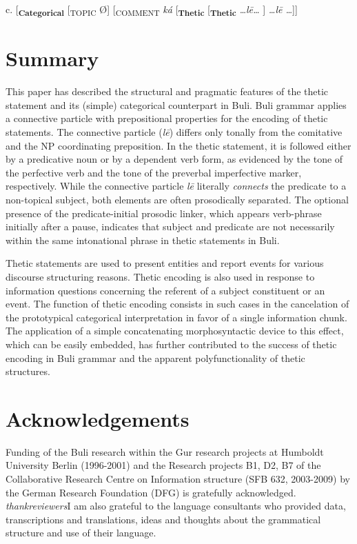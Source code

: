 \documentclass[output=paper]{langsci/langscibook}
\begin{document}
    c.   [\textbf{\textsubscript{Categorical}}\textsubscript{ }[\textsubscript{TOPIC }Ø]\textsubscript{ }[\textsubscript{COMMENT}\textit{ ká} [\textbf{\textsubscript{Thetic}}\textsubscript{  }[\textbf{\textsubscript{Thetic}} \textit{…l\={e}… }] \textit{…l\={e} …}]]
\z

\section{Summary} %

This paper has described the structural and pragmatic features of the thetic statement and its (simple) categorical counterpart in Buli. Buli grammar applies a connective particle with prepositional properties for the encoding of thetic statements. The connective particle (\textit{l\={e}})\textit{ }differs only tonally from the comitative and the NP coordinating preposition. In the thetic statement, it is followed either by a predicative noun or by a dependent verb form, as evidenced by the tone of the perfective verb and the tone of the preverbal imperfective marker, respectively. While the connective particle\textit{ l\={e} }literally \textit{connects} the predicate to a non-topical subject, both elements are often prosodically separated. The optional presence of the predicate-initial prosodic linker, which appears verb-phrase initially after a pause, indicates that subject and predicate are not necessarily within the same intonational phrase in thetic statements in Buli. 

Thetic statements are used to present entities and report events for various discourse structuring reasons. Thetic encoding is also used in response to information questions concerning the referent of a subject constituent or an event. The function of thetic encoding consists in such cases in the cancelation of the prototypical categorical interpretation in favor of a single information chunk. The application of a simple concatenating morphosyntactic device to this effect, which can be easily embedded, has further contributed to the success of thetic encoding in Buli grammar and the apparent polyfunctionality of thetic structures. 

\section*{ Acknowledgements }

Funding of the Buli research within the Gur research projects at Humboldt University Berlin (1996-2001) and the Research projects B1, D2, B7 of the Collaborative Research Centre on Information structure (SFB 632, 2003-2009) by the German Research Foundation (DFG) is gratefully acknowledged. \emph{\textup{thank}}\emph{\textup{reviewers}}I am also grateful to the language consultants who provided data, transcriptions and translations, ideas and thoughts about the grammatical structure and use of their language.
\end{document}

